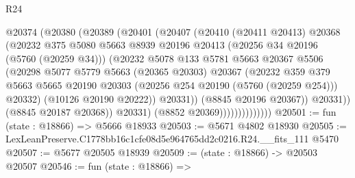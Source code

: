 \begin{lexlean}{R24}
\begin{coremodule}
                            @20374
                              (@20380
                                (@20389
                                  (@20401
                                    (@20407
                                      (@20410
                                        (@20411 @20413)
                                        @20368
                                        (@20232
                                          @375
                                          @5080
                                          @5663
                                          @8939
                                          @20196
                                          @20413
                                          (@20256 @34 @20196 (@5760 (@20259 @34)))
                                          (@20232
                                            @5078
                                            @133
                                            @5781
                                            @5663
                                            @20367
                                            @5506
                                            (@20298
                                              @5077
                                              @5779
                                              @5663
                                              (@20365 @20303)
                                              @20367
                                              (@20232
                                                @359
                                                @379
                                                @5663
                                                @5665
                                                @20190
                                                @20303
                                                (@20256 @254 @20190 (@5760 (@20259 @254)))
                                                @20332)
                                              (@10126 @20190 @20222))
                                            @20331))
                                        (@8845 @20196 @20367))
                                      @20331))
                                  (@8845 @20187 @20368))
                                @20331)
                              (@8852 @20369))))))))))))))
@20501 := fun (state : @18866) => @5666 @18933
@20503 := @5671 @4802 @18930
@20505 := LexLeanPreserve.C1778bb16c1cfe08d5e964765dd2c0216.R24.__fits_111 @5470
@20507 := @5677 @20505 @18939
@20509 := (state : @18866) -> @20503 @20507
@20546 := fun (state : @18866) =>

\end{coremodule}
\end{lexlean}
